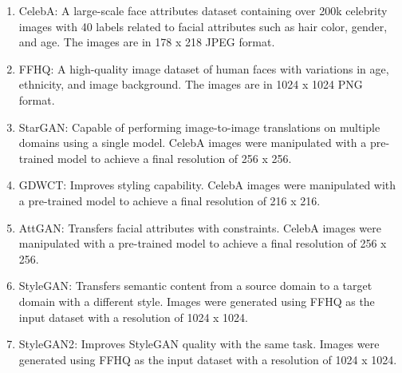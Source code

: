         \begin{enumerate}
            \item CelebA\cite{7410782}: A large-scale face attributes dataset containing over 200k celebrity images with 40 labels related to facial attributes such as hair color, gender, and age. The images are in 178 x 218 JPEG format.
            
            \item FFHQ\cite{NVlabs_ffhq_dataset}: A high-quality image dataset of human faces with variations in age, ethnicity, and image background. The images are in 1024 x 1024 PNG format.
            
            \item StarGAN\cite{choi2018stargan}: Capable of performing image-to-image translations on multiple domains using a single model. CelebA images were manipulated with a pre-trained model to achieve a final resolution of 256 x 256.
            
            \item GDWCT\cite{cho2019imagetoimage}: Improves styling capability. CelebA images were manipulated with a pre-trained model to achieve a final resolution of 216 x 216.
    
            \item AttGAN\cite{8718508}: Transfers facial attributes with constraints. CelebA images were manipulated with a pre-trained model to achieve a final resolution of 256 x 256.
        
            \item StyleGAN\cite{Karras_2020_CVPR}: Transfers semantic content from a source domain to a target domain with a different style. Images were generated using FFHQ as the input dataset with a resolution of 1024 x 1024.
        
            \item StyleGAN2\cite{inproceedings}: Improves StyleGAN quality with the same task. Images were generated using FFHQ as the input dataset with a resolution of 1024 x 1024.
        \end{enumerate}


